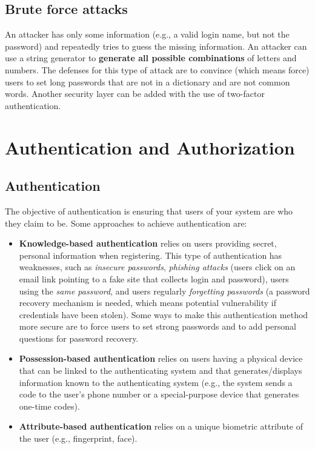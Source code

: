 \subsection{Brute force attacks}

An attacker has only some information (e.g., a valid login name, but not the password) and repeatedly tries to guess the missing information. An attacker can use a string generator to \textbf{generate all possible combinations} of letters and numbers. The defenses for this type of attack are to convince (which means force) users to set long passwords that are not in a dictionary and are not common words. Another security layer can be added with the use of two-factor authentication.

\section{Authentication and Authorization}

\subsection{Authentication}

The objective of authentication is ensuring that users of your system are who they claim to be. Some approaches to achieve authentication are:
\begin{itemize}
    \item \textbf{Knowledge-based authentication} relies on users providing secret, personal information when registering. This type of authentication has weaknesses, such as \textit{insecure passwords}, \textit{phishing attacks} (users click on an email link pointing to a fake site that collects login and password), users using the \textit{same password}, and users regularly \textit{forgetting passwords} (a password recovery mechanism is needed, which means potential vulnerability if credentials have been stolen). Some ways to make this authentication method more secure are to force users to set strong passwords and to add personal questions for password recovery.

    \item \textbf{Possession-based authentication} relies on users having a physical device that can be linked to the authenticating system and that generates/displays information known to the authenticating system (e.g., the system sends a code to the user’s phone number or a special-purpose device that generates one-time codes).
    
    \item \textbf{Attribute-based authentication} relies on a unique biometric attribute of the user (e.g., fingerprint, face).
\end{itemize}

